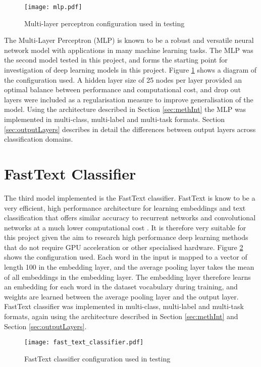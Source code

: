 \documentclass[Dissertation.tex]{subfiles}
\begin{document}
\begin{figure}
	\centering
	\texttt{[image: mlp.pdf]}
	\caption{Multi-layer perceptron configuration used in testing}
	\label{fig:mlp}
\end{figure}
The Multi-Layer Perceptron (MLP) is known to be a robust and versatile neural network model \cite{castellaniCompetitiveCoevolutionMultilayer2018} with applications in many machine learning tasks. The MLP was the second model tested in this project, and forms the starting point for investigation of deep learning models in this project. Figure \ref{fig:mlp} shows a diagram of the configuration used. A hidden layer size of 25 nodes per layer provided an optimal balance between performance and computational cost, and drop out layers were included as a regularisation measure to improve generalisation of the model. Using the architecture described in Section \ref{sec:methInt} the MLP was implemented in multi-class, multi-label and multi-task formats. Section \ref{sec:outputLayers} describes in detail the differences between output layers across classification domains.

\section{FastText Classifier}\label{sec:fastTextMethod}
The third model implemented is the FastText classifier. FastText is know to be a very efficient, high performance architecture for learning embeddings and text classification that offers similar accuracy to recurrent networks and convolutional  networks at a much lower computational cost \cite{joulinBagTricksEfficient2016}. It is therefore very suitable for this project given the aim to research high performance deep learning methods that do not require GPU acceleration or other specialised hardware. Figure \ref{fig:fastTextClassifier} shows the configuration used. Each word in the input is mapped to a vector of length 100 in the embedding layer, and the average pooling layer takes the mean of all embeddings in the embedding layer. The embedding layer therefore learns an embedding for each word in the dataset vocabulary during training, and weights are learned between the average pooling layer and the output layer. FastText classifier was implemented in multi-class, multi-label and multi-task formats, again using the architecture described in Section \ref{sec:methInt} and Section \ref{sec:outputLayers}.

\begin{figure}\centering
	\texttt{[image: fast\_text\_classifier.pdf]}
	\caption{FastText classifier configuration used in testing}
	\label{fig:fastTextClassifier}
\end{figure}
\end{document}
